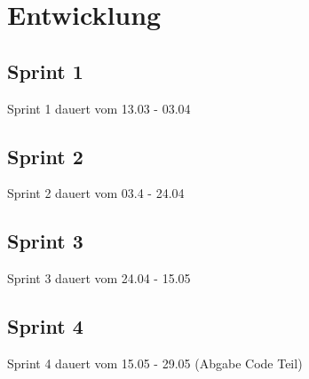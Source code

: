 \chapter{Entwicklung}
\label{chap:entwicklung}

\section{Sprint 1}
\label{sec:sprint_1}
Sprint 1 dauert vom 13.03 - 03.04
\section{Sprint 2}
\label{sec:sprint_2}
Sprint 2 dauert vom 03.4 - 24.04
\section{Sprint 3}
\label{sec:sprint_3}
Sprint 3 dauert vom 24.04 - 15.05
\section{Sprint 4}
\label{sec:sprint_4}
Sprint 4 dauert vom 15.05 - 29.05 (Abgabe Code Teil)